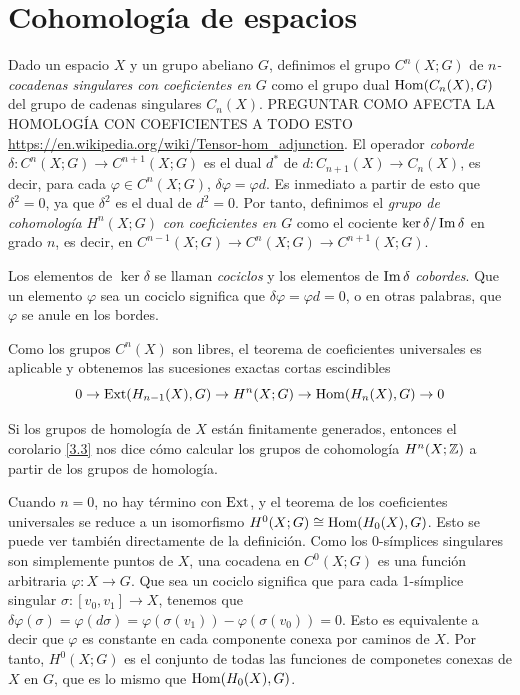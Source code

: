 \documentclass[TA.tex]{subfiles}
\begin{document}
\section{Cohomología de espacios}

Dado un espacio $X$ y un grupo abeliano $G$, definimos el grupo $C^n(X;G)$ de \emph{$n$-cocadenas singulares con coeficientes en $G$} como el grupo dual $\operatorname{Hom}(C_n(X),G)$ del grupo de cadenas singulares $C_n(X)$. PREGUNTAR COMO AFECTA LA HOMOLOGÍA CON COEFICIENTES A TODO ESTO \url{https://en.wikipedia.org/wiki/Tensor-hom_adjunction}. El operador \emph{coborde} $\delta:C^n(X;G)\to C^{n+1}(X;G)$ es el dual $d^*$ de $d:C_{n+1}(X)\to C_n(X)$, es decir, para cada $\varphi\in C^n(X;G)$, $\delta\varphi=\varphi d$. Es inmediato a partir de esto que $\delta^2=0$, ya que $\delta^2$ es el dual de $d^2=0$. Por tanto, definimos el \emph{grupo de cohomología} $H^n(X;G)$ \emph{con coeficientes en $G$} como el cociente $\ker\delta/\operatorname{Im}\delta$ en grado $n$, es decir, en $C^{n-1}(X;G)\to C^n(X;G)\to C^{n+1}(X;G)$.

Los elementos de $\ker\delta$ se llaman \emph{cociclos} y los elementos de $\operatorname{Im}\delta$ \emph{cobordes}. Que un elemento $\varphi$ sea un cociclo significa que $\delta\varphi=\varphi d=0$, o en otras palabras, que $\varphi$ se anule en los bordes.

Como los grupos $C^n(X)$ son libres, el teorema de coeficientes universales es aplicable y obtenemos las sucesiones exactas cortas escindibles
\[0\to \operatorname{Ext}(H_{n-1}(X),G)\to H^n(X;G)\to\operatorname{Hom}(H_n(X),G)\to 0\]

Si los grupos de homología de $X$ están finitamente generados, entonces el corolario \ref{3.3} nos dice cómo calcular los grupos de cohomología $H^n(X;\mathbb{Z})$ a partir de los grupos de homología.

Cuando $n=0$, no hay término con $\operatorname{Ext}$, y el teorema de los coeficientes universales se reduce a un isomorfismo $H^0(X;G)\cong \operatorname{Hom}(H_0(X),G)$. Esto se puede ver también directamente de la definición. Como los 0-símplices singulares son simplemente puntos de $X$, una cocadena en $C^0(X;G)$ es una función arbitraria $\varphi:X\to G$. Que sea un cociclo significa que para cada 1-símplice singular $\sigma:[v_0,v_1]\to X$, tenemos que $\delta\varphi(\sigma)=\varphi(d\sigma)=\varphi(\sigma(v_1))-\varphi(\sigma(v_0))=0$. Esto es equivalente a decir que $\varphi$ es constante en cada componente conexa por caminos de $X$. Por tanto, $H^0(X;G)$ es el conjunto de todas las funciones de componetes conexas de $X$ en $G$, que es lo mismo que $\operatorname{Hom}(H_0(X),G)$. 
\end{document}
